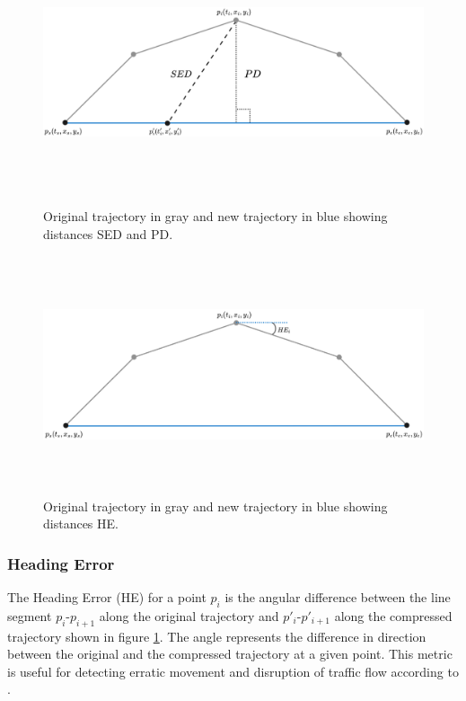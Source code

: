 \begin{figure}[ht]
    \begin{minipage}[b]{0.49\linewidth}
        \centering
        \includegraphics[width=\linewidth, height=7cm, keepaspectratio]{./figures/sed.png}
        \caption{Original trajectory in gray and new trajectory in blue showing distances SED and PD.}
        \label{fig:sed}
    \end{minipage}
    \begin{minipage}[b]{0.49\linewidth}
        \centering
        \includegraphics[width=\linewidth, height=7cm, keepaspectratio]{./figures/heading_error.png}
        \caption{Original trajectory in gray and new trajectory in blue showing distances HE.}
        \label{fig:hed}
    \end{minipage}
\end{figure}

\subsubsection{Heading Error}
The Heading Error (HE) for a point $p_{i}$ is the angular difference between the line segment $p_{i}$-$p_{i+1}$ along the original trajectory and $p'_{i}$-$p'_{i+1}$ along the compressed trajectory shown in figure \ref{fig:hed}. The angle represents the difference in direction between the original and the compressed trajectory at a given point. This metric is useful for detecting erratic movement and disruption of traffic flow according to \cite{TrajFramework}.

